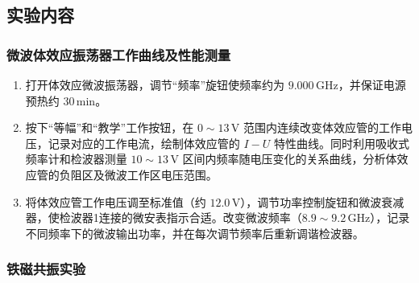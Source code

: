 \documentclass[a4paper, 1.5lines]{ctexart}
\begin{document}
\subsection{实验内容}

\subsubsection{微波体效应振荡器工作曲线及性能测量}

\begin{enumerate}

\item 打开体效应微波振荡器，调节“频率”旋钮使频率约为 $9.000\,\text{GHz}$，并保证电源预热约 $30\,\text{min}$。

\item 按下“等幅”和“教学”工作按钮，在 $0\sim13\,\text{V}$ 范围内连续改变体效应管的工作电压，记录对应的工作电流，绘制体效应管的 $I-U$ 特性曲线。同时利用吸收式频率计和检波器测量 $10\sim13\,\text{V}$ 区间内频率随电压变化的关系曲线，分析体效应管的负阻区及微波工作区电压范围。

\item 将体效应管工作电压调至标准值（约 $12.0\,\text{V}$），调节功率控制旋钮和微波衰减器，使检波器1连接的微安表指示合适。改变微波频率（$8.9\sim9.2\,\text{GHz}$），记录不同频率下的微波输出功率，并在每次调节频率后重新调谐检波器。

\end{enumerate}


\subsubsection{铁磁共振实验}
\end{document}
